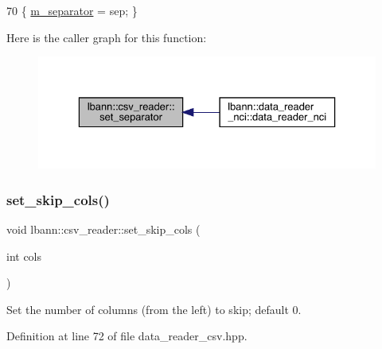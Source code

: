 \begin{DoxyCode}
70 \{ \hyperlink{classlbann_1_1csv__reader_abab4a731daa751856f083c117ac8862a}{m\_separator} = sep; \}
\end{DoxyCode}
Here is the caller graph for this function\+:\nopagebreak
\begin{figure}[H]
\begin{center}
\leavevmode
\includegraphics[width=329pt]{classlbann_1_1csv__reader_a58c71a6b3a82c064b349ae9d995bcffc_icgraph}
\end{center}
\end{figure}
\mbox{\label{classlbann_1_1csv__reader_a1ab853e9c9a37a1e6c51811bf5be421b}} 
\subsubsection{\texorpdfstring{set\+\_\+skip\+\_\+cols()}{set\_skip\_cols()}}
{\footnotesize\ttfamily void lbann\+::csv\+\_\+reader\+::set\+\_\+skip\+\_\+cols (\begin{DoxyParamCaption}\item[{int}]{cols }\end{DoxyParamCaption})\hspace{0.3cm}{\ttfamily [inline]}}



Set the number of columns (from the left) to skip; default 0. 



Definition at line 72 of file data\+\_\+reader\+\_\+csv.\+hpp.


